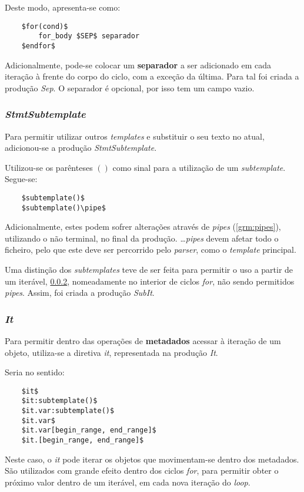 \documentclass[../relatorio.tex]{subfiles}
\begin{document}
Deste modo, apresenta-se como:
\begin{verbatim}
    $for(cond)$
        for_body $SEP$ separador
    $endfor$
\end{verbatim}

Adicionalmente, pode-se colocar um \textbf{separador} a ser adicionado
em cada iteração à frente do corpo do ciclo, com a exceção da última.
Para tal foi criada a produção \textit{Sep}.
O separador é opcional, por isso tem um campo vazio.

\subsubsection{\textit{StmtSubtemplate}} \label{grm:sub}
Para permitir utilizar outros \textit{templates} e substituir
o seu texto no atual, adicionou-se a produção \textit{StmtSubtemplate}.

Utilizou-se os parênteses $()$ como sinal para a utilização de um 
\textit{subtemplate}.
Segue-se:
\begin{verbatim}
    $subtemplate()$
    $subtemplate()\pipe$
\end{verbatim}

Adicionalmente, estes podem sofrer alterações através de \textit{pipes} (\ref{grm:pipes}),
utilizando o não terminal, no final da produção.
\dots \textit{pipes} devem afetar todo o ficheiro, pelo que este deve ser 
percorrido pelo \textit{parser}, como o \textit{template} principal.

Uma distinção dos \textit{subtemplates}
teve de ser feita para permitir o uso a partir
de um iterável, \ref{grm:it},
nomeadamente no interior de ciclos \textit{for}, não sendo permitidos \textit{pipes}.
Assim, foi criada a produção \textit{SubIt}.

\subsubsection{\textit{It}} \label{grm:it}
Para permitir dentro das operações de \textbf{metadados} acessar à iteração
de um objeto, utiliza-se a diretiva \textit{it},
representada na produção \textit{It}.

Seria no sentido:
\begin{verbatim}
    $it$
    $it:subtemplate()$
    $it.var:subtemplate()$
    $it.var$
    $it.var[begin_range, end_range]$
    $it.[begin_range, end_range]$
\end{verbatim}

Neste caso, o \textit{it} pode iterar os objetos que 
movimentam-se dentro dos metadados.
São utilizados com grande efeito dentro dos ciclos \textit{for}, 
para permitir obter o próximo valor dentro de um 
iterável, em cada nova iteração do \textit{loop}.
\end{document}
